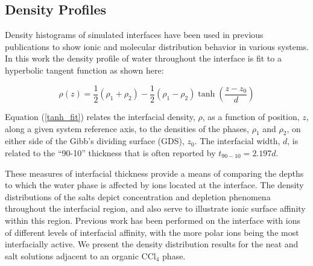 \subsection{Density Profiles}

Density histograms of simulated interfaces have been used in previous publications to show ionic and molecular distribution behavior in various systems.\cite{Chang1995,Eggimann2008,Du2008,Wick2006c,Petersen2005a,Hore2008,Walker2006b,Walker2007b} In this work the density profile of water throughout the interface is fit to a hyperbolic tangent function\cite{Wick2006c,MATSUMOTO1988} as shown here:

\begin{equation}\label{tanh_fit}
	\rho(z) = \frac12(\rho_1+\rho_2) - \frac12\left(\rho_1-\rho_2\right)\tanh\left(\frac{z-z_0}{d}\right)
\end{equation}

Equation (\ref{tanh_fit}) relates the interfacial density, $\rho$, as a function of position, $z$, along a given system reference axis, to the densities of the phases, $\rho_1$ and $\rho_2$, on either side of the Gibb's dividing surface (GDS), $z_0$. The interfacial width, $d$, is related to the ``90-10'' thickness that is often reported by $t_{90-10} = 2.197d$.

These measures of interfacial thickness provide a means of comparing the depths to which the water phase is affected by ions located at the interface. The density distributions of the salts depict concentration and depletion phenomena throughout the interfacial region, and also serve to illustrate ionic surface affinity within this region. Previous work has been performed on the \airwat interface with ions of different levels of interfacial affinity, with the more polar ions being the most interfacially active.\cite{Luo2006,Petersen2006,Petersen2005a,Allen2009,Hofft2006,Beattie2005,Bian2009,Dang2004b} We present the density distribution results for the neat \ctcwat and salt solutions adjacent to an organic CCl$_4$ phase. %


